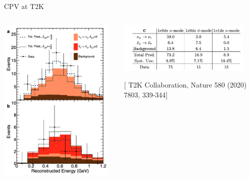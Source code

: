 \begin{frame}{CPV at T2K}

  \begin{columns}[T]
    \begin{column}{0.40\textwidth}
      \begin{center}
         \includegraphics[width=0.95\textwidth]{./images/3nu/accelerator/t2k_cpv_nature2019_spectra}\\
      \end{center}
    \end{column}
    \begin{column}{0.60\textwidth}
      \begin{center}
         \includegraphics[width=0.90\textwidth]{./images/3nu/accelerator/t2k_cpv_nature2019_nevent_table}\\
      \end{center}
      \vspace{0.3cm}
      [{\color{blue} \scriptsize T2K Collaboration, Nature 580 (2020) 7803, 339-344}]\\
    \end{column}
  \end{columns}


\end{frame}
